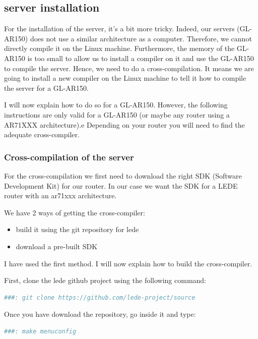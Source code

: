 \subsection{server installation}

For the installation of the server, it's a bit more tricky. Indeed, our servers (GL-AR150) does not use a similar architecture as a computer. Therefore, we cannot directly compile it on the Linux machine. Furthermore, the memory of the GL-AR150 is too small to allow us to install a compiler on it and use the GL-AR150 to compile the server. Hence, we need to do a cross-compilation. It means we are going to install a new compiler on the Linux machine to tell it how to compile the server for a GL-AR150.

I will now explain how to do so for a GL-AR150. However, the following instructions are only valid for a GL-AR150 (or maybe any router using a AR71XXX architecture).e Depending on your router you will need to find the adequate cross-compiler.

\subsubsection{Cross-compilation of the server}

For the cross-compilation we first need to download the right SDK (Software Development Kit) for our router. In our case we want the SDK for a LEDE router with an ar71xxx architecture.

We have 2 ways of getting the cross-compiler:
\begin{itemize}
	\item build it using the git repository for lede
	\item download a pre-built SDK
\end{itemize}

I have used the first method. I will now explain how to build the cross-compiler.

First, clone the lede github project using the following command:\\
\begin{lstlisting}[language=bash]
  ###: git clone https://github.com/lede-project/source
\end{lstlisting}

Once you have download the repository, go inside it and type:
\begin{lstlisting}[language=bash]
  ###: make menuconfig
\end{lstlisting}

